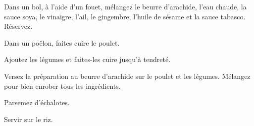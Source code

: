 \begin{steps}
    \item Dans un bol, à l’aide d’un fouet, mélangez le beurre d’arachide, l’eau chaude, la sauce soya, le vinaigre, l’ail, le gingembre, l’huile de sésame et la sauce tabasco. Réservez.
    \item Dans un poêlon, faites cuire le poulet.
    \item Ajoutez les légumes et faites-les cuire jusqu'à tendreté.
    \item Versez la préparation au beurre d’arachide sur le poulet et les légumes. Mélangez pour bien enrober tous les ingrédients.
    \item Parsemez d’échalotes.
    \item Servir sur le riz.
\end{steps}

